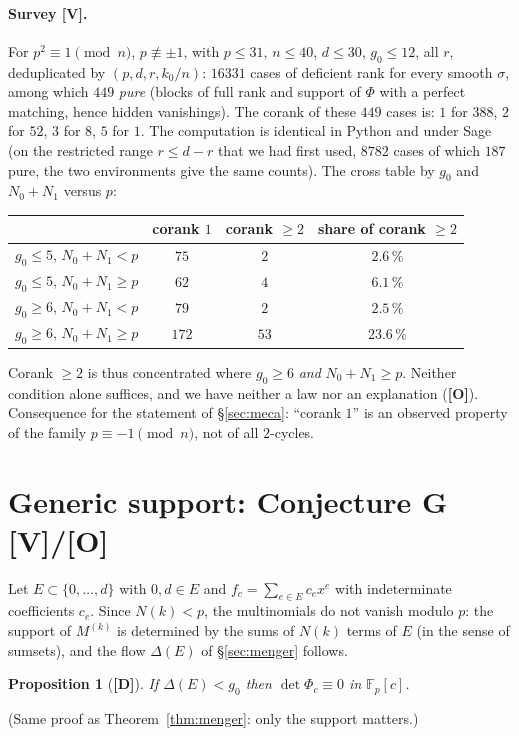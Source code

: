 \documentclass[11pt,a4paper]{article}
\newtheorem{proposition}[theorem]{Proposition}
\newcommand{\F}{\mathbb{F}}
\begin{document}
\paragraph{Survey \textbf{[V]}.} For $p^2\equiv1\pmod n$, $p\not\equiv\pm1$, with
$p\le31$, $n\le40$, $d\le30$, $g_0\le12$, all $r$, deduplicated by
$(p,d,r,k_0/n)$: $16331$ cases of deficient rank for every smooth $\sigma$,
among which $449$ \emph{pure} (blocks of full rank and support of $\Phi$ with a
perfect matching, hence hidden vanishings). The corank of these $449$ cases is:
$1$ for $388$, $2$ for $52$, $3$ for $8$, $5$ for $1$. The computation is
identical in Python and under Sage (on the restricted range $r\le d-r$ that we
had first used, $8782$ cases of which $187$ pure, the two environments give the
same counts). The cross table by $g_0$ and $N_0+N_1$ versus $p$:
\begin{center}
\begin{tabular}{lccc}
 & corank $1$ & corank $\ge2$ & share of corank $\ge2$\\\hline
$g_0\le5$, $N_0+N_1<p$ & $75$ & $2$ & $2.6\,\%$\\
$g_0\le5$, $N_0+N_1\ge p$ & $62$ & $4$ & $6.1\,\%$\\
$g_0\ge6$, $N_0+N_1<p$ & $79$ & $2$ & $2.5\,\%$\\
$g_0\ge6$, $N_0+N_1\ge p$ & $172$ & $53$ & $23.6\,\%$\\\hline
\end{tabular}
\end{center}
Corank $\ge2$ is thus concentrated where $g_0\ge6$ \emph{and} $N_0+N_1\ge p$.
Neither condition alone suffices, and we have neither a law nor an explanation
(\textbf{[O]}). Consequence for the statement of \S\ref{sec:meca}: ``corank $1$''
is an observed property of the family $p\equiv-1\pmod n$, not of all $2$-cycles.

\section{Generic support: Conjecture G \textbf{[V]/[O]}}
\label{sec:conjG}

Let $E\subset\{0,\dots,d\}$ with $0,d\in E$ and $f_c=\sum_{e\in E}c_ex^e$ with
indeterminate coefficients $c_e$. Since $N(k)<p$, the multinomials do not vanish
modulo $p$: the support of $M^{(k)}$ is determined by the sums of $N(k)$ terms of
$E$ (in the sense of sumsets), and the flow $\Delta(E)$ of \S\ref{sec:menger}
follows.

\begin{proposition}[\textbf{[D]}]
If $\Delta(E)<g_0$ then $\det\Phi_c\equiv0$ in $\F_p[c]$.
\end{proposition}
(Same proof as Theorem~\ref{thm:menger}: only the support matters.)
\end{document}
